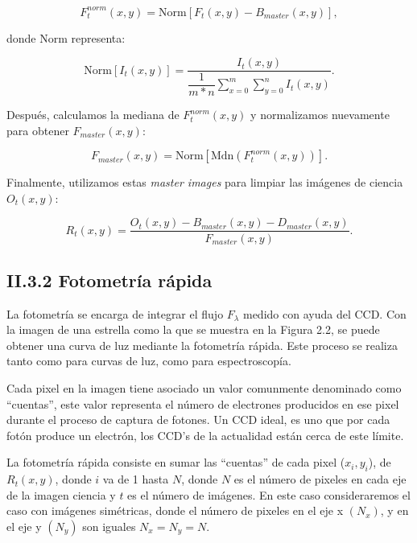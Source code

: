 \begin{equation}
  \displaystyle F^{norm}_{t}(x,y) = \mbox{Norm} \left[ F_{t}(x,y) - B_{master}(x,y)\right],
\end{equation}

donde $\mbox{Norm}$ representa:

\begin{equation}
  \displaystyle \mbox{Norm}\left[I_{t}(x,y)\right] =  \dfrac{I_{t}(x,y)}{\dfrac{1}{m*n} \sum_{x=0}^{m}\sum_{y=0}^{n} I_{t}(x,y)}.
\end{equation}

Después, calculamos la mediana de $F^{norm}_{t}(x,y)$ y normalizamos nuevamente para obtener $F_{master}(x,y)$:

\begin{equation}
  \displaystyle F_{master}(x,y) = \mbox{Norm} \left[ \mbox{Mdn} \left( F^{norm}_{t}(x,y)\right)\right].
\end{equation}

Finalmente, utilizamos estas \textit{master images} para limpiar las imágenes de ciencia $O_{t}(x,y)$:

\begin{equation}
  \displaystyle R_{t}(x,y) = \dfrac{O_{t}(x,y) - B_{master}(x,y) - D_{master}(x,y)}{F_{master}(x,y)}.
\end{equation}

\subsection*{II.3.2 Fotometría rápida}

La fotometría se encarga de integrar el flujo $F_{\lambda}$ medido con ayuda del CCD. Con la imagen de una estrella como la que se muestra en la Figura 2.2, se puede obtener una curva de luz mediante la fotometría rápida. Este proceso se realiza tanto como para curvas de luz, como para espectroscopía.

Cada pixel en la imagen tiene asociado un valor comunmente denominado como ``cuentas'', este valor representa el número de electrones producidos en ese pixel durante el proceso de captura de fotones. Un CCD ideal, es uno que por cada fotón produce un electrón, los CCD's de la actualidad están cerca de este límite.

La fotometría rápida consiste en sumar las ``cuentas'' de cada pixel ($x_{i},y_{i}$), de $R_{t}(x,y) $, donde $ i $ va de 1 hasta $ N $, donde $ N $ es el número de pixeles en cada eje de la imagen ciencia  y $ t $ es el número de imágenes. En este caso consideraremos el caso con imágenes simétricas, donde el número de pixeles en el eje x $(N_{x})$, y en el eje y $(N_{y})$ son iguales $N_{x}=N_{y}=N$. 

